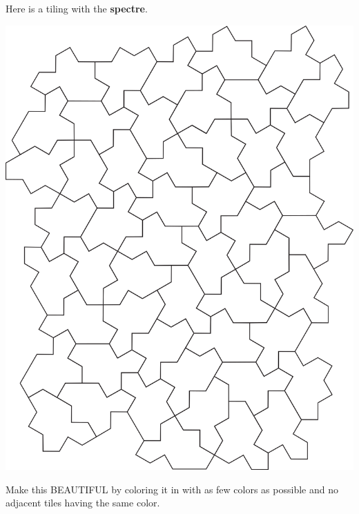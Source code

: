 \documentclass[noauthor,nooutcomes,handout,hints,12pt]{ximera}
\begin{document}
\begin{question}
  Here is a tiling with the \textbf{spectre}.
  \begin{center}
    \includegraphics[scale=.9]{spectre.png}
  \end{center}
  Make this BEAUTIFUL by coloring it in with as few colors as possible
  and no adjacent tiles having the same color.
\end{question}

\mynewpage
\end{document}
